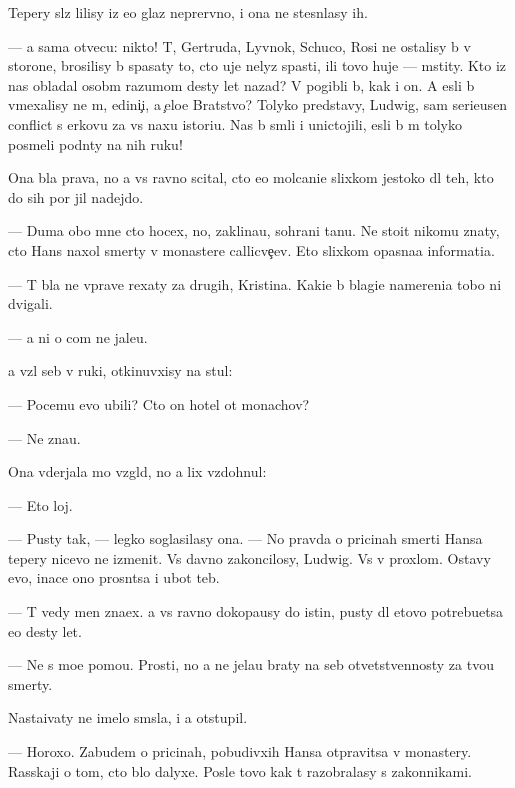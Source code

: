 \documentclass[10pt]{book}
\begin{document}
Tepery sl{\e}z{\yi} lilisy iz {\y}e{\y}o glaz neprer{\yi}vno, i ona ne stesn{\ia}lasy ih.

— {\Y}a sama otvecu: nikto! T{\yi}, Gertruda, Lyv{\e}nok, Schuco, Rosi ne ostalisy b{\yi} v storone, brosilisy b{\yi} spasaty to, cto uje nelyz{\ia} spasti, ili tovo huje — mstity. Kto iz nas obladal osob{\yi}m razumom des{\ia}ty let nazad? V{\yi} pogibli b{\yi}, kak i on. A {\y}esli b{\yi} vmexalisy ne m{\yi}, {\y}edini{\c}i, a {\c}elo{\y}e Bratstvo? Tolyko predstavy, Ludwig, sam{\yi}{\y} serieusen{\yi}{\y} conflict s {\C}erkov{\y}u za vs{\io} naxu istori{\y}u. Nas b{\yi} sm{\ia}li i unictojili, {\y}esli b{\yi} m{\yi} tolyko posmeli podn{\ia}ty na nih ruku!

Ona b{\yi}la prava, no {\y}a vs{\e} ravno scital, cto {\y}e{\y}o molcani{\y}e slixkom jestoko dl{\ia} teh, kto do sih por jil nadejdo{\y}.

— Duma{\y} obo mne cto hocex, no, zaklina{\y}u, sohrani ta{\y}nu. Ne stoit nikomu znaty, cto Hans naxol smerty v monastere callicve{\c}ev. Eto slixkom opasna{\y}a informati{\y}a.

— T{\yi} b{\yi}la ne vprave rexaty za drugih, Kristina. Kaki{\y}e b{\yi} blagi{\y}e namereni{\y}a tobo{\y} ni dvigali.

— {\Y}a ni o com ne jale{\y}u.

{\Y}a vz{\ia}l seb{\ia} v ruki, otkinuvxisy na stul:

— Pocemu {\y}evo ubili? Cto on hotel ot monachov?

— Ne zna{\y}u.

Ona v{\yi}derjala mo{\y} vzgl{\ia}d, no {\y}a lix vzdohnul:

— Eto loj.

— Pusty tak, — legko soglasilasy ona. — No pravda o pricinah smerti Hansa tepery nicevo ne izmenit. Vs{\e} davno zakoncilosy, Ludwig. Vs{\e} v proxlom. Ostavy {\y}evo, inace ono prosn{\e}tsa i ub{\y}ot teb{\ia}.

— T{\yi} vedy men{\ia} zna{\y}ex. {\Y}a vs{\e} ravno dokopa{\y}usy do istin{\yi}, pusty dl{\ia} etovo potrebu{\y}etsa {\y}e{\x}o des{\ia}ty let.

— Ne s mo{\y}e{\y} pomo{\x}{\y}u. Prosti, no {\y}a ne jela{\y}u braty na seb{\ia} otvetstvennosty za tvo{\y}u smerty.

Nasta{\y}ivaty ne imelo sm{\yi}sla, i {\y}a otstupil.

— Horoxo. Zabudem o pricinah, pobudivxih Hansa otpravitsa v monastery. Rasskaji o tom, cto b{\yi}lo dalyxe. Posle tovo kak t{\yi} razobralasy s zakonnikami.
\end{document}
